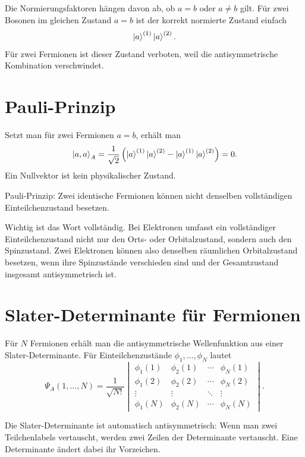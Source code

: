 \begin{notebox}
Die Normierungsfaktoren hängen davon ab, ob \(a=b\) oder \(a\neq b\) gilt. Für zwei Bosonen im gleichen Zustand \(a=b\) ist der korrekt normierte Zustand einfach
\[
    \left|a\right\rangle^{(1)}\left|a\right\rangle^{(2)}.
\]
Für zwei Fermionen ist dieser Zustand verboten, weil die antisymmetrische Kombination verschwindet.
\end{notebox}

\section{Pauli-Prinzip}

Setzt man für zwei Fermionen \(a=b\), erhält man
\[
    \left|a,a\right\rangle_A
    =\frac{1}{\sqrt{2}}
    \left(\left|a\right\rangle^{(1)}\left|a\right\rangle^{(2)}-
    \left|a\right\rangle^{(1)}\left|a\right\rangle^{(2)}\right)=0.
\]
Ein Nullvektor ist kein physikalischer Zustand.

\begin{conceptbox}
Pauli-Prinzip: Zwei identische Fermionen können nicht denselben vollständigen Einteilchenzustand besetzen.
\end{conceptbox}

Wichtig ist das Wort vollständig. Bei Elektronen umfasst ein vollständiger Einteilchenzustand nicht nur den Orts- oder Orbitalzustand, sondern auch den Spinzustand. Zwei Elektronen können also denselben räumlichen Orbitalzustand besetzen, wenn ihre Spinzustände verschieden sind und der Gesamtzustand insgesamt antisymmetrisch ist.

\section{Slater-Determinante für Fermionen}

Für \(N\) Fermionen erhält man die antisymmetrische Wellenfunktion aus einer Slater-Determinante. Für Einteilchenzustände \(\phi_1,\dots,\phi_N\) lautet
\[
    \Psi_A(1,\dots,N)
    =\frac{1}{\sqrt{N!}}
    \begin{vmatrix}
    \phi_1(1) & \phi_2(1) & \cdots & \phi_N(1)\\
    \phi_1(2) & \phi_2(2) & \cdots & \phi_N(2)\\
    \vdots & \vdots & \ddots & \vdots\\
    \phi_1(N) & \phi_2(N) & \cdots & \phi_N(N)
    \end{vmatrix}.
\]

\begin{conceptbox}
Die Slater-Determinante ist automatisch antisymmetrisch: Wenn man zwei Teilchenlabels vertauscht, werden zwei Zeilen der Determinante vertauscht. Eine Determinante ändert dabei ihr Vorzeichen.
\end{conceptbox}

